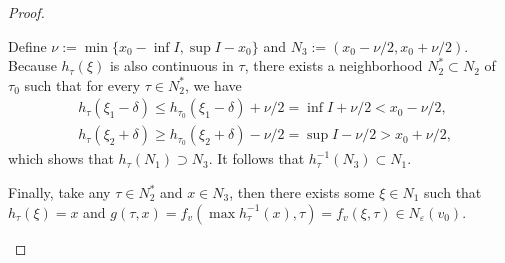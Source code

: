 \documentclass[a4paper]{article}
\theoremstyle{definition}
\theoremstyle{plain}
\begin{document}
\begin{proof}
\begin{outline}
  \1 Define $\nu := \min \{ x_{0} - \inf I, \sup I - x_{0}\}$ and
  $N_{3} := (x_{0} - \nu / 2, x_{0} + \nu / 2)$. Because $h_{\tau}(\xi)$ is also
  continuous in $\tau$, there exists a neighborhood $N_{2}^{*} \subset N_{2}$ of
  $\tau_{0}$ such that for every $\tau \in N_{2}^{*}$, we have
  \begin{align*}
  &h_{\tau}(\xi_{1} - \delta) \leq h_{\tau_{0}}(\xi_{1} - \delta) + \nu/2 = \inf I + \nu /2 < x_{0} - \nu/2 , \\
  &h_{\tau}(\xi_{2} + \delta) \geq h_{\tau_{0}}(\xi_{2} + \delta) - \nu/2 = \sup I - \nu /2 > x_{0} + \nu/2 ,
  \end{align*}
  which shows that $h_{\tau}(N_{1}) \supset N_{3}$. It follows that
  $h_{\tau}^{-1}(N_{3}) \subset N_{1}$.

  \1 Finally, take any $\tau \in N_{2}^{*}$ and $x \in N_{3}$, then there exists
  some $\xi \in N_{1}$ such that $h_{\tau}(\xi) = x$ and
  $g(\tau, x) = f_{v}(\max h_{\tau}^{-1}(x), \tau) = f_{v}(\xi, \tau) \in N_{\varepsilon}(v_{0})$.
  \qedhere
\end{outline}
\end{proof}

\pagebreak
\end{document}
